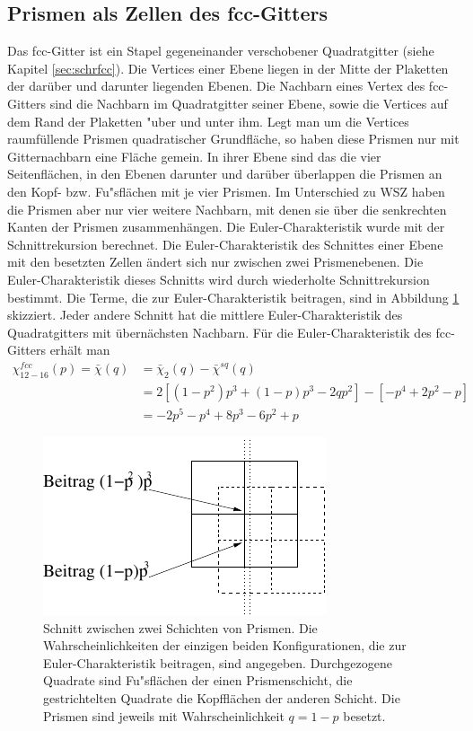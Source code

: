 \subsection{Prismen als Zellen des fcc-Gitters}
Das fcc-Gitter ist ein Stapel gegeneinander verschobener Quadratgitter (siehe Kapitel \ref{sec:schrfcc}). Die Vertices einer Ebene liegen in der Mitte der Plaketten der dar\"uber und darunter liegenden Ebenen. Die Nachbarn eines Vertex des fcc-Gitters sind die Nachbarn im Quadratgitter seiner Ebene, sowie die Vertices auf dem Rand der Plaketten "uber und unter ihm. Legt man um die Vertices raumf\"ullende Prismen quadratischer Grundfl\"ache, so haben diese Prismen nur mit Gitternachbarn eine Fl\"ache gemein. In ihrer Ebene sind das die vier Seitenfl\"achen, in den Ebenen darunter und dar\"uber \"uberlappen die Prismen an den Kopf- bzw. Fu"sfl\"achen mit je vier Prismen. Im Unterschied zu WSZ haben die Prismen aber nur vier weitere Nachbarn, mit denen sie \"uber die senkrechten Kanten der Prismen zusammenh\"angen. Die Euler-Charakteristik wurde mit der Schnittrekursion berechnet. Die Euler-Charakteristik des Schnittes einer Ebene mit den besetzten Zellen \"andert sich nur zwischen zwei Prismenebenen. Die Euler-Charakteristik dieses Schnitts wird durch wiederholte Schnittrekursion bestimmt. Die Terme, die zur Euler-Charakteristik beitragen, sind in Abbildung \ref{fig:fcc_quader} skizziert. Jeder andere Schnitt hat die mittlere Euler-Charakteristik des Quadratgitters mit \"ubern\"achsten Nachbarn. F\"ur die Euler-Charakteristik des fcc-Gitters erh\"alt man 
\begin{equation}
\begin{split}
\chi^{fcc}_{12-16}(p)=\bar{\chi}(q) & = \bar{\chi}_{2}(q)-\bar{\chi}^{sq}(q) \\
       & =  2\left[(1-p^2)p^3+(1-p)p^3 - 
       2qp^2\right]-\left[ -p^4+2p^2-p \right]\\
       & = -2p^5-p^4+8p^3-6p^2+p
\end{split}
\end{equation}

\begin{figure}[tpb]
\centering
\includegraphics{./Fluct_topo-Figs/fcc-qu-schnitt}
\caption{Schnitt zwischen zwei Schichten von Prismen. Die Wahrscheinlichkeiten der einzigen beiden Konfigurationen, die zur Euler-Charakteristik beitragen, sind angegeben. Durchgezogene Quadrate sind Fu"sfl\"achen der einen Prismenschicht, die gestrichtelten Quadrate die Kopffl\"achen der anderen Schicht. Die Prismen sind jeweils mit Wahrscheinlichkeit $q=1-p$ besetzt. }
\label{fig:fcc_quader}
\end{figure}


